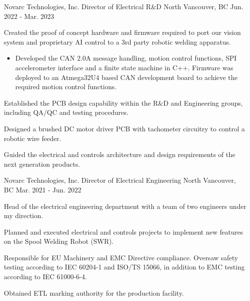 \begin{cventries}
    \cventry
    {Novarc Technologies, Inc.} %
    {Director of Electrical R\&D} %
    {North Vancouver, BC} %
    {Jun. 2022 - Mar. 2023} %
    { %
        \begin{cvitems}
            \item {Created the proof of concept hardware and firmware required to port our vision system and proprietary AI control to a 3rd party robotic
                        welding apparatus.}
            \begin{itemize}
                \item {Developed the CAN 2.0A message handling, motion control functions, SPI accelerometer interface and a finite state machine in C++. Firmware was deployed to an Atmega32U4 based CAN development board to achieve the required motion control functions.}
            \end{itemize}
            \item {Established the PCB design capability within the R\&D and Engineering groups, including QA/QC and testing procedures.}
            \item {Designed a brushed DC motor driver PCB with tachometer circuitry to control a robotic wire feeder.}
            \item {Guided the electrical and controls architecture and design requirements of the next generation products.}
        \end{cvitems}
    }


    \cventry
    {Novarc Technologies, Inc.} %
    {Director of Electrical Engineering} %
    {North Vancouver, BC} %
    {Mar. 2021 - Jun. 2022} %
    { %
        \begin{cvitems}
            \item {Head of the electrical engineering department with a team of two engineers under my direction.}
            \item {Planned and executed electrical and controls projects to implement new features on the Spool Welding Robot (SWR).}
            \item {Responsible for EU Machinery and EMC Directive compliance. Oversaw safety testing according to IEC 60204-1 and ISO/TS 15066, in addition to EMC testing according to IEC 61000-6-4.}
            \item {Obtained ETL marking authority for the production facility.}
        \end{cvitems}
    }


\end{cventries}

